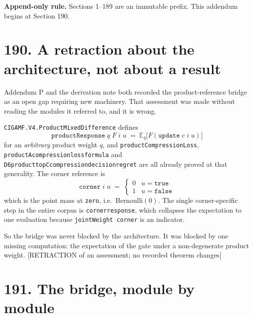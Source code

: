 \documentclass[9pt,twocolumn]{article}
\newcommand{\eclass}[1]{\textsf{[#1]}}
\renewcommand{\_}{\CIGunderscore\allowbreak}
\begin{document}
\sloppy
{}

\textbf{Append-only rule.} Sections 1--189 are an immutable prefix. This addendum begins at Section 190.

\section*{190. A retraction about the architecture, not about a result}

Addendum P and the derivation note both recorded the product-reference bridge as an open gap requiring new machinery. That assessment was made without reading the modules it referred to, and it is wrong.

\texttt{CIGAMF.V4.ProductMixedDifference} defines
\[ \texttt{productResponse}\;q\;F\;i\;u \;=\; \mathbb{E}_q\big[F(\texttt{update}\;c\;i\;u)\big] \]
for an \emph{arbitrary} product weight $q$, and \texttt{productCompressionLoss}, \texttt{productA\_compression\_loss\_formula} and \texttt{D6\_product\_topC\_compression\_decision\_regret} are all already proved at that generality. The corner reference is
\[ \texttt{corner}\;i\;u \;=\; \begin{cases}0 & u=\texttt{true}\\ 1 & u=\texttt{false}\end{cases} \]
which is the point mass at \texttt{zero}, i.e.\ Bernoulli$(0)$. The single corner-specific step in the entire corpus is \texttt{corner\_response}, which collapses the expectation to one evaluation because \texttt{jointWeight corner} is an indicator.

So the bridge was never blocked by the architecture. It was blocked by one missing computation: the expectation of the gate under a non-degenerate product weight. \eclass{RETRACTION of an assessment; no recorded theorem changes}

\section*{191. The bridge, module by module}
\end{document}
